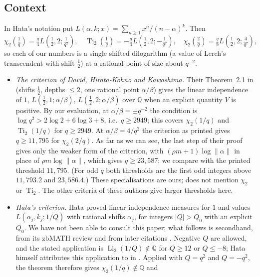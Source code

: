 \documentclass[11pt]{amsart}
\theoremstyle{definition}
\theoremstyle{remark}
\numberwithin{equation}{section}
\newcommand{\QQ}{\mathbb{Q}}
\newcommand{\Li}{\operatorname{Li}}
\newcommand{\Ti}{\operatorname{Ti}}
\begin{document}
\subsection{Context}\label{sec:context}
In Hata's notation put $L(\alpha,k;x)=\sum_{n\ge1}x^n/(n-\alpha)^k$. Then
\begin{equation}\label{eq:lerch}
  \chi_2(\tfrac1q)=\tfrac q4L(\tfrac12,2;\tfrac1{q^2}),\quad
  \Ti_2(\tfrac1q)=-\tfrac q4L(\tfrac12,2;-\tfrac1{q^2}),\quad
  \chi_2(\tfrac2q)=\tfrac q8L(\tfrac12,2;\tfrac4{q^2}),
\end{equation}
so each of our numbers is a single shifted dilogarithm (a value of Lerch's transcendent with shift $\frac12$) at a
rational point of size about $q^{-2}$.
\begin{itemize}
\item \emph{The criterion of David, Hirata-Kohno and Kawashima.} Their Theorem~2.1 in \cite{DHK2022} (shifts $\frac12$,
  depths $\le2$, one rational point $\alpha/\beta$) gives the linear independence of $1$, $L(\frac12,1;\alpha/\beta)$,
  $L(\frac12,2;\alpha/\beta)$ over $\QQ$ when an explicit quantity $V$ is positive. By our evaluation,
  at $\alpha/\beta=\pm q^{-2}$ the condition is $\log q^2>2\log2+6\log3+8$, i.e.\ $q\ge2949$; this covers
  $\chi_2(1/q)$ and $\Ti_2(1/q)$ for $q\ge2949$. At $\alpha/\beta=4/q^2$ the criterion as printed gives $q\ge11{,}795$
  for $\chi_2(2/q)$. As far as we can see, the last step of their proof gives only the weaker form of the criterion, with
  $(\rho m+1)\log\|\alpha\|$ in place of $\rho m\log\|\alpha\|$, which gives $q\ge23{,}587$; we compare with the printed
  threshold $11{,}795$. (For odd $q$ both thresholds are the first odd integers above $11{,}793.2$ and $23{,}586.4$.) These
  specialisations are ours; \cite{DHK2022} does not mention $\chi_2$ or $\Ti_2$. The other criteria of these authors
  \cite{DHK2020,DHK2022b} give larger thresholds here.
\item \emph{Hata's criterion.} Hata \cite{Hata1990} proved linear independence measures for $1$ and values
  $L(\alpha_j,k_j;1/Q)$ with rational shifts $\alpha_j$, for integers $|Q|>Q_0$ with an explicit $Q_0$. We have not been
  able to consult this paper; what follows is secondhand, from its zbMATH review and from later citations
  \cite{DHK2020,DHK2022}. Negative $Q$ are allowed, and the stated application is $\Li_2(1/Q)\notin\QQ$ for $Q\ge12$
  or $Q\le-8$; Hata himself attributes this application to \cite{Hata1990} in \cite[\S1]{Hata1993}. Applied with $Q=q^2$ and $Q=-q^2$, the theorem therefore gives $\chi_2(1/q)\notin\QQ$ and

\end{itemize}
\end{document}
